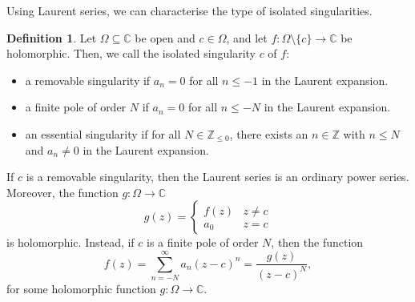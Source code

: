 \documentclass[a4paper, openany]{memoir}
\theoremstyle{definition}
\newtheorem{definition}{Definition}[section]
\theoremstyle{plain}
\begin{document}
Using Laurent series, we can characterise the type of isolated singularities.
\begin{definition}
Let $\Omega \subseteq \mathbb{C}$ be open and $c \in \Omega$, and let $f: \Omega \setminus \{c\} \to \mathbb{C}$ be holomorphic. Then, we call the isolated singularity $c$ of $f$:
\begin{itemize}
    \item a removable singularity if $a_n = 0$ for all $n \leq -1$ in the Laurent expansion.
    \item a finite pole of order $N$ if $a_n = 0$ for all $n \leq -N$ in the Laurent expansion.
    \item an essential singularity if for all $N \in \mathbb{Z}_{\leq 0}$, there exists an $n \in \mathbb{Z}$ with $n \leq N$ and $a_n \neq 0$ in the Laurent expansion.
\end{itemize}
\end{definition}
\noindent If $c$ is a removable singularity, then the Laurent series is an ordinary power series. Moreover, the function $g: \Omega \to \mathbb{C}$
\[g(z) = \begin{cases}
f(z) & z \neq c \\
a_0 & z = c
\end{cases}\]
is holomorphic. Instead, if $c$ is a finite pole of order $N$, then the function
\[f(z) = \sum_{n=-N}^\infty a_n (z - c)^n = \frac{g(z)}{(z - c)^N},\]
for some holomorphic function $g: \Omega \to \mathbb{C}$.
\end{document}
